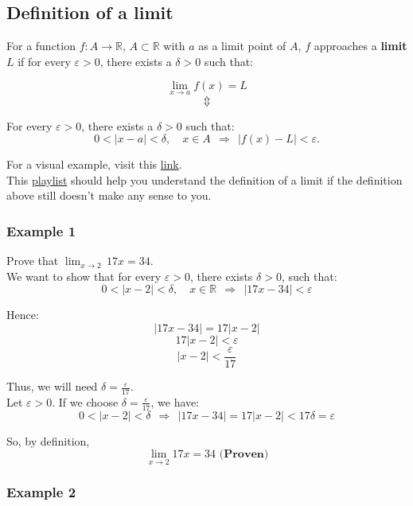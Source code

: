 \documentclass[11pt]{article}
\begin{document}
\subsection{Definition of a limit}
\label{sec:org08a46f0}
For a function \(f: A \rightarrow \mathbb{R}, \, A \subset \mathbb{R}\) with \(a\) as a limit point of \(A\), \(f\) approaches a \textbf{limit} \(L\) if for every \(\varepsilon > 0\), there exists a \(\delta > 0\) such that:

\[\lim_{x \rightarrow a} f(x) = L\]
\[\Updownarrow\]

For every \(\varepsilon > 0\), there exists a \(\delta > 0\) such that:
\[0 < |x - a| < \delta, \quad x \in A \ \ \Rightarrow \ \ |f(x) - L| < \varepsilon.\]

For a visual example, visit this \href{https://www.desmos.com/calculator/fmcqwj1ama}{link}.
\\[0pt]

This \href{https://www.khanacademy.org/math/ap-calculus-ab/ab-limits-new/ab-limits-optional/v/limit-intuition-review}{playlist} should help you understand the definition of a limit if the definition above still doesn't make any sense to you.

\subsubsection{Example 1}
\label{sec:org9452ff1}

Prove that \(\lim_{x \rightarrow 2} \, 17x = 34\).
\\[0pt]

We want to show that for every \(\varepsilon > 0\), there exists \(\delta > 0\), such that:
\[0 < |x - 2| < \delta, \quad x \in \mathbb{R} \ \ \Rightarrow \ \ |17x - 34| < \varepsilon\]

Hence:
\[|17x - 34| = 17|x - 2|\]
\[17|x - 2| < \varepsilon\]
\[|x - 2| < \frac{\varepsilon}{17}\]

Thus, we will need \(\delta = \frac{\varepsilon}{17}\).
\\[0pt]

Let \(\varepsilon > 0\). If we choose \(\delta = \frac{\varepsilon}{17}\), we have:
\[0 < |x - 2| < \delta \ \ \Rightarrow \ \ |17x - 34| = 17|x - 2| < 17\delta = \varepsilon\]

So, by definition,
\[\lim_{x \rightarrow 2} 17x = 34 \textbf{ (Proven)}\]

\newpage

\subsubsection{Example 2}
\label{sec:org8c57d7f}
\end{document}
